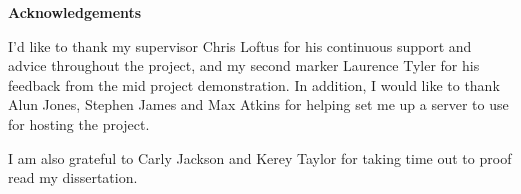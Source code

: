 \thispagestyle{empty}

\begin{center}
    {\LARGE\bf Acknowledgements}
\end{center}

I'd like to thank my supervisor Chris Loftus for his continuous support and advice throughout the project, and my second marker Laurence Tyler for his feedback from the mid project demonstration. In addition, I would like to thank Alun Jones, Stephen James and Max Atkins for helping set me up a server to use for hosting the project.

I am also grateful to Carly Jackson and Kerey Taylor for taking time out to proof read my dissertation.
